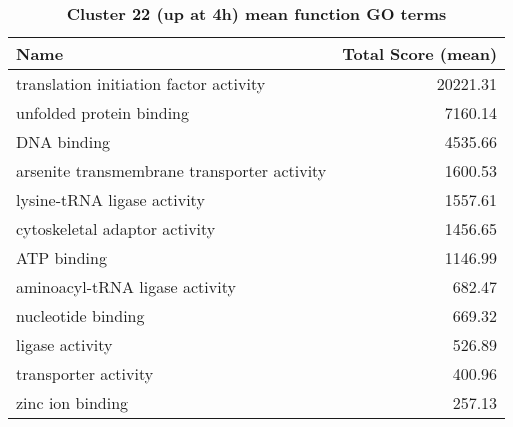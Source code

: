 \begin{table}[hp]
\begin{center} \sf
\begin{tabular}{p{}r}
\toprule
\textbf{Name}                               & \textbf{Total Score (mean)} \\ \midrule
translation initiation factor activity      & 20221.31                    \\
unfolded protein binding                    & 7160.14                     \\
DNA binding                                 & 4535.66                     \\
arsenite transmembrane transporter activity & 1600.53                     \\
lysine-tRNA ligase activity                 & 1557.61                     \\
cytoskeletal adaptor activity               & 1456.65                     \\
ATP binding                                 & 1146.99                     \\
aminoacyl-tRNA ligase activity              & 682.47                      \\
nucleotide binding                          & 669.32                      \\
ligase activity                             & 526.89                      \\
transporter activity                        & 400.96                      \\
zinc ion binding                            & 257.13                      \\ \bottomrule                     
\end{tabular}
\end{center}

\caption[Cluster 22 (up at 4h) mean function GO terms]{\sf \textbf{Cluster 22 (up at 4h) mean function GO terms}}
\label{tab:cls22-function}
\end{table}